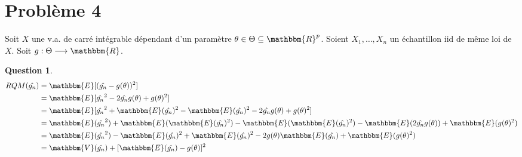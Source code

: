 \documentclass[12pt]{article}
\newcommand{\R}{\mathbbm{R}}
\newcommand{\1}{\mathbbm{1}}
\newcommand{\E}{\mathbbm{E}}
\newcommand{\V}{\mathbbm{V}}
\newcommand{\gn}{\hat{g_n}}
\theoremstyle{definition}\newtheorem{defn}{Définition}
\theoremstyle{definition}\newtheorem{exm}{Exemple}
\theoremstyle{definition}\newtheorem{rem}{Remarque}
\theoremstyle{definition}\newtheorem{algo}{Algorithme}
\theoremstyle{remark}\newtheorem{exo}{Exercice}
\theoremstyle{remark}\newtheorem{nota}{Notation}
\theoremstyle{definition}\newtheorem{1q}{Question}
\theoremstyle{definition}\newtheorem{2q}{Question}
\theoremstyle{definition}\newtheorem{3q}{Question}
\theoremstyle{definition}\newtheorem{4q}{Question}
\theoremstyle{definition}\newtheorem{2qs1}{}
\theoremstyle{definition}\newtheorem{2qs2}{}
\theoremstyle{definition}\newtheorem{2qs3}{}
\theoremstyle{definition}\newtheorem{2qs4}{}
\theoremstyle{definition}\newtheorem{4qs2}{}
\theoremstyle{definition}\newtheorem{4qs3}{}
\begin{document}
\pagebreak

\section{Problème 4}

Soit $X$ une v.a. de carré intégrable dépendant d'un paramètre $\theta\in\Theta\subseteq \R^p$.  \newline
Soient $X_1,\ldots,X_n$ un échantillon iid de même loi de $X$.\newline
Soit $g:\Theta\longrightarrow\R$.


\begin{4q}
\begin{align*}
RQM(\gn) &= \E[(\gn - g(\theta))^2]\\
&= \E[\gn^2-2\gn g(\theta)+g(\theta)^2]\\
&= \E[\gn^2+\E(\gn)^2-\E(\gn)^2-2\gn g(\theta)+g(\theta)^2]\\
&= \E(\gn^2) + \E(\E(\gn)^2) - \E(\E(\gn)^2) - \E(2\gn g(\theta)) + \E(g(\theta)^2)\\
&= \E(\gn^2) - \E(\gn)^2 + \E(\gn)^2 - 2g(\theta)\E(\gn) + \E(g(\theta)^2)\\
&= \V(\gn) + [\E(\gn)-g(\theta)]^2
\end{align*}
\end{4q}
\end{document}
